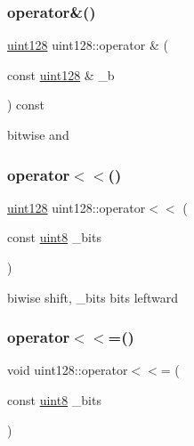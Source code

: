 \subsubsection{\texorpdfstring{operator\&()}{operator\&()}}
{\footnotesize\ttfamily \hyperlink{classuint128}{uint128} uint128\+::operator \& (\begin{DoxyParamCaption}\item[{const \hyperlink{classuint128}{uint128} \&}]{\+\_\+b }\end{DoxyParamCaption}) const\hspace{0.3cm}{\ttfamily [inline]}}



bitwise and 

\mbox{\label{classuint128_a24dc256af129ab352a5d52793dfbe514}} 
\subsubsection{\texorpdfstring{operator$<$$<$()}{operator<<()}}
{\footnotesize\ttfamily \hyperlink{classuint128}{uint128} uint128\+::operator$<$$<$ (\begin{DoxyParamCaption}\item[{const \hyperlink{types_8h_a115946cb5fc5879545e9ccea096a6031}{uint8}}]{\+\_\+bits }\end{DoxyParamCaption})\hspace{0.3cm}{\ttfamily [inline]}}



biwise shift, \+\_\+bits bits leftward 

\mbox{\label{classuint128_a09c291d8b7c8f1e2d3a4dd3a763408d9}} 
\subsubsection{\texorpdfstring{operator$<$$<$=()}{operator<<=()}}
{\footnotesize\ttfamily void uint128\+::operator$<$$<$= (\begin{DoxyParamCaption}\item[{const \hyperlink{types_8h_a115946cb5fc5879545e9ccea096a6031}{uint8}}]{\+\_\+bits }\end{DoxyParamCaption})\hspace{0.3cm}{\ttfamily [inline]}}



